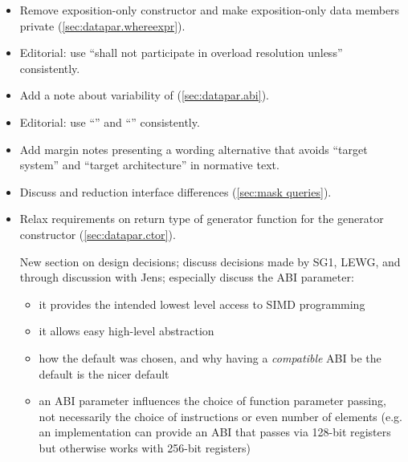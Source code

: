 \begin{itemize}
  \item Remove exposition-only  constructor and make exposition-only data members private (\ref{sec:datapar.whereexpr}).
  \item Editorial: use “shall not participate in overload resolution unless” consistently.
  \item Add a note about variability of  (\ref{sec:datapar.abi}).
  \item Editorial: use “\targetArch{}” and “\currentTarget{}” consistently.
  \item Add margin notes presenting a wording alternative that avoids “target system” and “target architecture” in normative text.
  \item Discuss \mask and  reduction interface differences (\ref{sec:mask queries}).
  \item Relax requirements on return type of generator function for the generator constructor (\ref{sec:datapar.ctor}).

  \todo New section on design decisions; discuss decisions made by SG1, LEWG, and through discussion with Jens; especially discuss the ABI parameter:
  \begin{itemize}
    \item it provides the intended lowest level access to SIMD programming
    \item it allows easy high-level abstraction
    \item how the default was chosen, and why having a \emph{compatible} ABI be the default is the nicer default
    \item an ABI parameter influences the choice of function parameter passing, not necessarily the choice of instructions or even number of elements (e.g. an implementation can provide an ABI that passes via 128-bit registers but otherwise works with 256-bit registers)
  \end{itemize}
\end{itemize}









